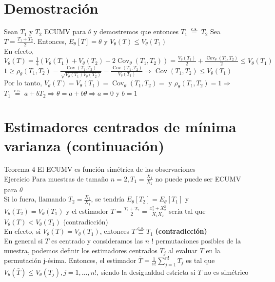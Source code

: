 \section*{Demostración}
Sean $T_{1}$ y $T_{2}$ ECUMV para $\theta$ y demostremos que entonces $T_{1} \stackrel{\text { c.s. }}{=} T_{2}$ Sea $T=\frac{T_{1}+T_{2}}{2}$. Entonces, $E_{\theta}[T]=\theta$ y $V_{\theta}(T) \leq V_{\theta}\left(T_{1}\right)$\\
En efecto, $V_{\theta}(T)=\frac{1}{4}\left(V_{\theta}\left(T_{1}\right)+V_{\theta}\left(T_{2}\right)+2 \operatorname{Cov}_{\theta}\left(T_{1}, T_{2}\right)\right)=\frac{V_{\theta}\left(T_{1}\right)}{2}+\frac{\operatorname{Cov}_{\theta}\left(T_{1}, T_{2}\right)}{2} \leq V_{\theta}\left(T_{1}\right)$\\
$1 \geq \rho_{\theta}\left(T_{1}, T_{2}\right)=\frac{\operatorname{Cov}\left(T_{1}, T_{2}\right)}{\sqrt{V_{\theta}\left(T_{1}\right) V_{\theta}\left(T_{2}\right)}}=\frac{\operatorname{Cov}\left(T_{1}, T_{2}\right)}{V_{\theta}\left(T_{1}\right)} \Rightarrow \operatorname{Cov}\left(T_{1}, T_{2}\right) \leq V_{\theta}\left(T_{1}\right)$\\
Por lo tanto, $V_{\theta}(T)=V_{\theta}\left(T_{1}\right)=\operatorname{Cov}_{\theta}\left(T_{1}, T_{2}\right)=$ y $\rho_{\theta}\left(T_{1}, T_{2}\right)=1 \Rightarrow$ $T_{1} \stackrel{\text { c.s. }}{=} a+b T_{2} \Rightarrow \theta=a+b \theta \Rightarrow a=0$ y $b=1$

\section*{Estimadores centrados de mínima varianza (continuación)}
Teorema 4 El ECUMV es función simétrica de las observaciones\\
Ejercicio Para muestras de tamaño $n=2, T_{1}=\frac{X_{1}}{X_{2}}$ no puede puede ser ECUMV para $\theta$\\
Si lo fuera, llamando $T_{2}=\frac{X_{2}}{X_{1}}$, se tendría $E_{\theta}\left[T_{2}\right]=E_{\theta}\left[T_{1}\right]$ y\\
$V_{\theta}\left(T_{2}\right)=V_{\theta}\left(T_{1}\right)$ y el estimador $T=\frac{T_{1}+T_{2}}{2}=\frac{x_{1}^{2}+X_{2}^{2}}{X_{1} X_{2}}$ sería tal que $V_{\theta}(T)<V_{\theta}\left(T_{1}\right)$ (contradicción)\\
En efecto, si \( V_{\theta}(T) = V_{\theta}(T_1) \), entonces \( T \overset{c.s.}{\equiv} T_1 \) \textbf{(contradicción)}\\
En general si $T$ es centrado y consideramos las $n$ ! permutaciones posibles de la muestra, podemos definir los estimadores centrados $T_{j}$ al evaluar $T$ en la permutación j-ésima. Entonces, el estimador $\bar{T}=\frac{1}{n!} \sum_{j=1}^{n!} T_{j}$ es tal que $V_{\theta}(\bar{T}) \leq V_{\theta}\left(T_{j}\right), j=1, \ldots, n!$, siendo la desigualdad estricta si $T$ no es simétrico

